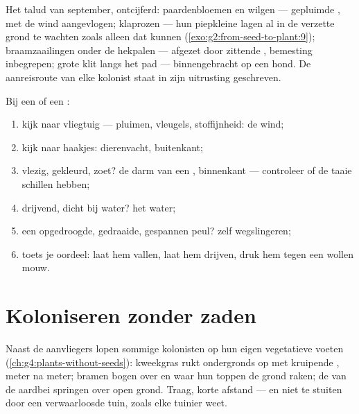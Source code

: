 \begin{example}\label{ex:g6:how-plants-spread:roadside}
Het talud van september, ontcijferd: paardenbloemen en wilgen ---
gepluimde , met de wind aangevlogen; klaprozen --- hun piepkleine
 lagen al in de verzette grond te wachten zoals alleen  dat
kunnen (\cref{exo:g2:from-seed-to-plant:9}); braamzaailingen onder de
hekpalen --- afgezet door zittende , bemesting inbegrepen; grote
klit langs het pad --- binnengebracht op een hond. De aanreisroute van
elke kolonist staat in zijn uitrusting geschreven.
\end{example}

\begin{method}\label{met:g6:how-plants-spread:name}
Bij een  of een :
\begin{enumerate}
  \item kijk naar vliegtuig --- pluimen, vleugels, stoffijnheid: de wind;
  \item kijk naar haakjes: dierenvacht, buitenkant;
  \item vlezig, gekleurd, zoet? de darm van een , binnenkant ---
        controleer of de  taaie schillen hebben;
  \item drijvend, dicht bij water? het water;
  \item een opgedroogde, gedraaide, gespannen peul? zelf wegslingeren;
  \item toets je oordeel: laat hem vallen, laat hem drijven, druk hem
        tegen een wollen mouw.
\end{enumerate}
\end{method}

\section{Koloniseren zonder zaden}

\begin{example}\label{ex:g6:how-plants-spread:vegetative}
Naast de aanvliegers lopen sommige kolonisten op hun eigen vegetatieve
voeten (\cref{ch:g4:plants-without-seeds}): kweekgras rukt ondergronds op
met kruipende , meter na meter; bramen bogen over en 
waar hun toppen de grond raken; de  van de aardbei springen over
open grond. Traag, korte afstand --- en niet te stuiten door een
verwaarloosde tuin, zoals elke tuinier weet.
\end{example}

